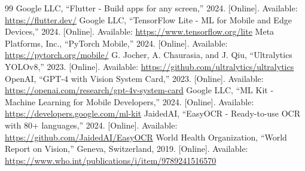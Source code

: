 \documentclass[12pt,a4paper]{report}
\begin{document}
\begin{thebibliography}{99}
   Google LLC, ``Flutter - Build apps for any screen,'' 2024. [Online]. Available: \url{https://flutter.dev/}
   Google LLC, ``TensorFlow Lite - ML for Mobile and Edge Devices,'' 2024. [Online]. Available: \url{https://www.tensorflow.org/lite}
   Meta Platforms, Inc., ``PyTorch Mobile,'' 2024. [Online]. Available: \url{https://pytorch.org/mobile/}
   G. Jocher, A. Chaurasia, and J. Qiu, ``Ultralytics YOLOv8,'' 2023. [Online]. Available: \url{https://github.com/ultralytics/ultralytics}
   OpenAI, ``GPT-4 with Vision System Card,'' 2023. [Online]. Available: \url{https://openai.com/research/gpt-4v-system-card}
   Google LLC, ``ML Kit - Machine Learning for Mobile Developers,'' 2024. [Online]. Available: \url{https://developers.google.com/ml-kit}
   JaidedAI, ``EasyOCR - Ready-to-use OCR with 80+ languages,'' 2024. [Online]. Available: \url{https://github.com/JaidedAI/EasyOCR}
   World Health Organization, ``World Report on Vision,'' Geneva, Switzerland, 2019. [Online]. Available: \url{https://www.who.int/publications/i/item/9789241516570}
\end{thebibliography}
\end{document}
